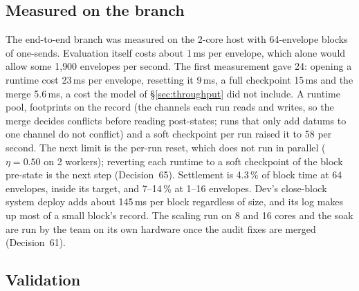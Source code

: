 \documentclass[11pt]{article}
\begin{document}
\subsection{Measured on the branch}\label{sec:measuredbranch}

The end-to-end branch was measured on the 2-core host with 64-envelope blocks of one-sends. Evaluation itself costs about 1\,ms per envelope, which alone would allow some 1{,}900 envelopes per second. The first measurement gave 24: opening a runtime cost 23\,ms per envelope, resetting it 9\,ms, a full checkpoint 15\,ms and the merge 5.6\,ms, a cost the model of \S\ref{sec:throughput} did not include. A runtime pool, footprints on the record (the channels each run reads and writes, so the merge decides conflicts before reading post-states; runs that only add datums to one channel do not conflict) and a soft checkpoint per run raised it to 58 per second. The next limit is the per-run reset, which does not run in parallel ($\eta = 0.50$ on 2 workers); reverting each runtime to a soft checkpoint of the block pre-state is the next step (Decision~65). Settlement is 4.3\,\% of block time at 64 envelopes, inside its target, and 7--14\,\% at 1--16 envelopes. Dev's close-block system deploy adds about 145\,ms per block regardless of size, and its log makes up most of a small block's record. The scaling run on 8 and 16 cores and the soak are run by the team on its own hardware once the audit fixes are merged (Decision~61).

\subsection{Validation}\label{sec:validation}
\end{document}
